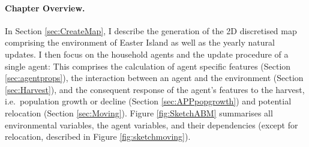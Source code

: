 
\paragraph{Chapter Overview.}
In Section \ref{sec:CreateMap}, I describe the generation of the 2D discretised map comprising the environment of Easter Island as well as the yearly natural updates. I then focus on the household agents and the update procedure of a single agent:
This comprises the calculation of agent specific features (Section \ref{sec:agentprops}), the interaction between an agent and the environment (Section \ref{sec:Harvest}), and the consequent response of the agent's features to the harvest, i.e.\ population growth or decline (Section \ref{sec:APPpopgrowth}) and potential relocation (Section \ref{sec:Moving}).
Figure \ref{fig:SketchABM} summarises all environmental variables, the agent variables, and their dependencies (except for relocation, described in Figure \ref{fig:sketchmoving}).

